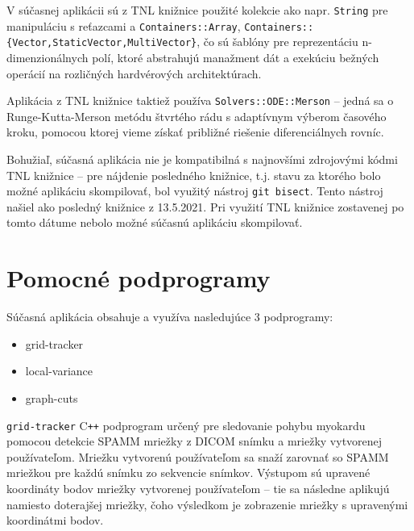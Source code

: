 V súčasnej aplikácii sú z TNL knižnice použité kolekcie ako napr. \texttt{String} pre manipuláciu s reťazcami a \texttt{Containers::Array}, \texttt{Containers::\{Vector,StaticVector,MultiVector\}}, čo sú šablóny pre reprezentáciu n-dimenzionálnych polí, ktoré abstrahujú manažment dát a exekúciu bežných operácií na rozličných hardvérových architektúrach.

Aplikácia z TNL knižnice taktiež používa \texttt{Solvers::ODE::Merson} -- jedná sa o Runge-Kutta-Merson metódu štvrtého rádu s adaptívnym výberom časového kroku, pomocou ktorej vieme získať približné riešenie diferenciálnych rovníc.

Bohužiaľ, súčasná aplikácia nie je kompatibilná s najnovšími zdrojovými kódmi TNL knižnice -- pre nájdenie posledného  knižnice, t.j. stavu za ktorého bolo možné aplikáciu skompilovať, bol využitý nástroj \texttt{git bisect}. Tento nástroj našiel ako posledný  knižnice z 13.5.2021. Pri využití TNL knižnice zostavenej po tomto dátume nebolo možné súčasnú aplikáciu skompilovať.

\section {Pomocné podprogramy}\label{helper_apps}
Súčasná aplikácia obsahuje a využíva nasledujúce 3 podprogramy:

\begin {itemize}
\item {grid-tracker}
\item {local-variance}
\item {graph-cuts}
\end {itemize}

\texttt{grid-tracker} C\texttt{++} podprogram určený pre sledovanie pohybu myokardu pomocou detekcie SPAMM mriežky z DICOM snímku a mriežky vytvorenej používateľom. Mriežku vytvorenú používateľom sa snaží zarovnať so SPAMM mriežkou pre každú snímku zo sekvencie snímkov. Výstupom sú upravené koordináty bodov mriežky vytvorenej používateľom -- tie sa následne aplikujú namiesto doterajšej mriežky, čoho výsledkom je zobrazenie mriežky s upravenými koordinátmi bodov. \newline

